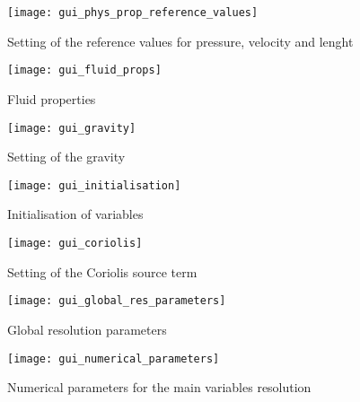 {{\begin{figure}[!ht]
\begin{center}
\texttt{[image: gui\_phys\_prop\_reference\_values]}
\caption{Setting of the reference values for pressure, velocity and lenght}
\label{gui_reference_values}
\end{center}
\end{figure}

\begin{figure}[!ht]
\begin{center}
\texttt{[image: gui\_fluid\_props]}
\caption{Fluid properties}
\label{gui_fluid_props}
\end{center}
\end{figure}

\begin{figure}[!ht]
\begin{center}
\texttt{[image: gui\_gravity]}
\caption{Setting of the gravity}
\label{gui_gravity}
\end{center}
\end{figure}

\begin{figure}[!ht]
\begin{center}
\texttt{[image: gui\_initialisation]}
\caption{Initialisation of variables}
\label{gui_initialisation}
\end{center}
\end{figure}


\begin{figure}[!ht]
\begin{center}
\texttt{[image: gui\_coriolis]}
\caption{Setting of the Coriolis source term}
\label{gui_coriolis}
\end{center}
\end{figure}

\begin{figure}[!ht]
\begin{center}
\texttt{[image: gui\_global\_res\_parameters]}
\caption{Global resolution parameters}
\label{gui_global_parameters}
\end{center}
\end{figure}

\begin{figure}[!ht]
\begin{center}
\texttt{[image: gui\_numerical\_parameters]}
\caption{Numerical parameters for the main variables resolution}
\label{gui_numerical_parameters}
\end{center}
\end{figure}

}}
